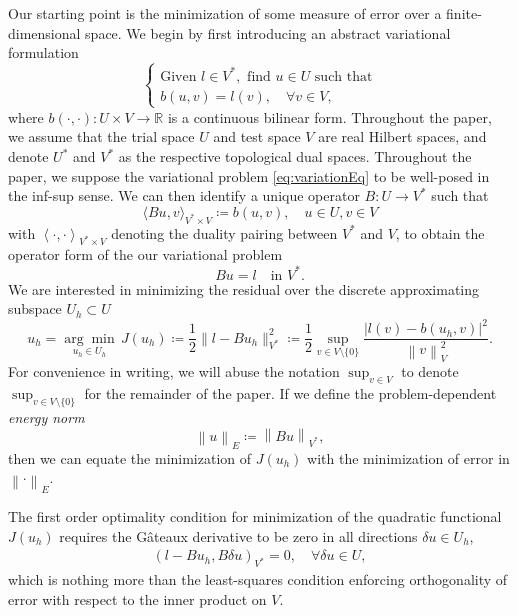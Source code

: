 \documentclass[final,leqno]{siamltex}
\newcommand{\eqnlab}[1]{\label{eq:#1}}
\newcommand{\eqnref}[1]{\eqref{eq:#1}}
\newcommand{\mbb}[1]{\mathbb{#1}}
\newcommand{\nor}[1]{\left\| #1 \right\|}
\newcommand{\LRp}[1]{\left( #1 \right)}
\newcommand{\LRa}[1]{\left\langle #1 \right\rangle}
\begin{document}
Our starting point is the minimization of some measure of error over a finite-dimensional space.  We begin by first introducing an abstract variational formulation 
\begin{equation}
\eqnlab{variationEq}
\left\{
  \begin{array}{l}
    \text{Given } l \in V^*, \text{ find } u \in U  \text{ such that} \\ 
    b(u,v) = l(v), \quad \forall v\in V,
  \end{array}
  \right.
\end{equation}
where $b\LRp{\cdot,\cdot}: U \times V \to \mbb{R}$ is a continuous bilinear form.  Throughout the paper, we assume that the trial space $U$ and test space $V$ are real Hilbert spaces, and denote $U^*$ and $V^*$ as the respective topological dual spaces.  Throughout the paper, we suppose the variational problem \eqnref{variationEq} to be well-posed in the inf-sup sense. We can then identify a unique operator $B:U\rightarrow V^*$ such that 
\[
\langle Bu,v\rangle_{V^* \times V} \coloneqq b(u,v), \quad u\in U, v\in V
\]
with $\LRa{\cdot, \cdot}_{V^*\times V}$ denoting the duality pairing between $V^*$ and $V$, to obtain the operator form of the our variational problem
\begin{equation}
\eqnlab{dualEq}
Bu = l \quad \text{in } V^*.
\end{equation}
We are interested in minimizing the residual over the discrete approximating subspace $U_h \subset U$
\[
u_h = \underset{u_h\in U_h}{\arg\min}\, J(u_h) \coloneqq \frac{1}{2}\|l-Bu_h\|_{V^*}^2 \coloneqq\frac{1}{2} \sup_{v\in V\setminus\{0\}} \frac{| l(v)- b(u_h,v)|^2}{\nor{v}_V^2}.
\]
For convenience in writing, we will abuse the notation $\sup_{v \in V}$ to denote $\sup_{v\in V\setminus\{0\}}$ for the remainder of the paper.  If we define the problem-dependent \textit{energy norm} 
\[
\nor{u}_E \coloneqq \nor{Bu}_{V^*},
\]
then we can equate the minimization of $J(u_h)$ with the minimization of error in $\nor{\cdot}_E$. 

The first order optimality condition for minimization of the quadratic functional $J(u_h)$ requires the G\^ateaux derivative to be zero in all directions $\delta u \in U_h$,
\begin{align}
\left(l-Bu_h,B\delta u\right)_{V^*} = 0, \quad \forall \delta u \in U,
\label{orthog}
\end{align}
which is nothing more than the least-squares condition enforcing orthogonality of error with respect to the inner product on $V$.  
\end{document}

